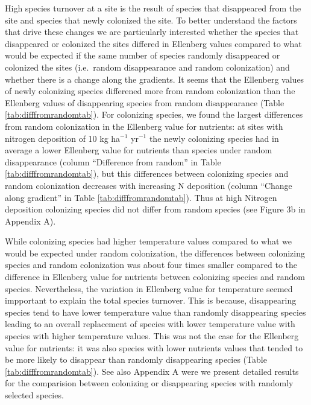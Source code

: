 \documentclass[fleqn,10pt,lineno]{wlpeerj} %
\theoremstyle{definition}
\theoremstyle{definition}
\theoremstyle{definition}
\theoremstyle{remark}
\begin{document}
High species turnover at a site is the result of species that
disappeared from the site and species that newly colonized the site. To
better understand the factors that drive these changes we are
particularly interested whether the species that disappeared or
colonized the sites differed in Ellenberg values compared to what would
be expected if the same number of species randomly disappeared or
colonized the sites (i.e.~random disappearance and random colonization)
and whether there is a change along the gradients. It seems that the
Ellenberg values of newly colonizing species differened more from random
colonization than the Ellenberg values of disappearing species from
random disappearance (Table \ref{tab:difffromrandomtab}). For colonizing
species, we found the largest differences from random colonization in
the Ellenberg value for nutrients: at sites with nitrogen deposition of
10 kg ha\(^{-1}\) yr\(^{-1}\) the newly colonizing species had in
average a lower Ellenberg value for nutrients than species under random
disappearance (column ``Difference from random'' in Table
\ref{tab:difffromrandomtab}), but this differences between colonizing
species and random colonization decreases with increasing N deposition
(column ``Change along gradient'' in Table \ref{tab:difffromrandomtab}).
Thus at high Nitrogen deposition colonizing species did not differ from
random species (see Figure 3b in Appendix A).

While colonizing species had higher temperature values compared to what
we would be expected under random colonization, the differences between
colonizing species and random colonization was about four times smaller
compared to the difference in Ellenberg value for nutrients between
colonizing species and random species. Nevertheless, the variation in
Ellenberg value for temperature seemed impportant to explain the total
species turnover. This is because, disappearing species tend to have
lower temperature value than randomly disappearing species leading to an
overall replacement of species with lower temperature value with species
with higher temperature values. This was not the case for the Ellenberg
value for nutrients: it was also species with lower nutrients values
that tended to be more likely to disappear than randomly disappearing
species (Table \ref{tab:difffromrandomtab}). See also Appendix A were we
present detailed results for the comparision between colonizing or
disappearing species with randomly selected species.
\end{document}
